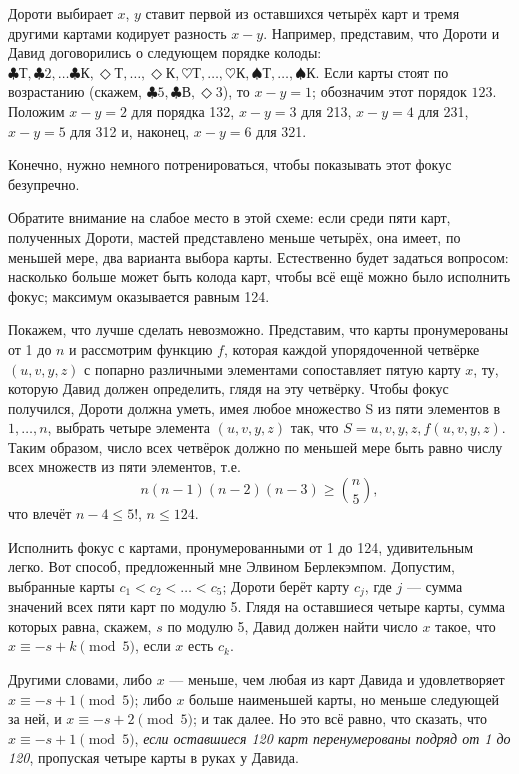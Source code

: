 Дороти выбирает $x$, $y$ ставит первой из оставшихся четырёх карт и тремя другими картами кодирует разность $x - y$.
Например, представим, что Дороти и Давид договорились о следующем порядке колоды: 
$\clubsuit \text{Т}, \clubsuit 2,\dots \clubsuit \text{К}, \Diamond \text{Т},\dots, \Diamond \text{К}, \heartsuit \text{Т}, \dots, \heartsuit \text{К}, \spadesuit  \text{Т}, \dots, \spadesuit \text{К}$.
Если карты стоят по возрастанию (скажем, $\clubsuit 5, \clubsuit \text{В}, \Diamond 3$), то $x - y = 1$; обозначим этот порядок $123$.
Положим $x - y = 2$ для порядка 132,
$x - y = 3$ для 213, $x - y = 4$ для 231, $x - y = 5$ для 312 и, наконец, $x - y = 6$ для 321.

Конечно, нужно немного потренироваться, чтобы показывать этот фокус безупречно.

\medskip

Обратите внимание на слабое место в этой схеме: если среди пяти карт, полученных Дороти, мастей представлено меньше четырёх, она имеет, по меньшей мере, два варианта выбора карты.
Естественно будет задаться вопросом: насколько больше может быть колода карт, чтобы всё ещё можно было исполнить фокус;
максимум оказывается равным 124.

Покажем, что лучше сделать невозможно.
Представим, что карты пронумерованы от 1 до $n$ и рассмотрим функцию $f$, которая каждой упорядоченной четвёрке $(u,v,y,z)$ с попарно различными элементами сопоставляет пятую карту $x$, ту, которую Давид должен определить, глядя на эту четвёрку.
Чтобы фокус получился, Дороти должна уметь, имея
любое множество S из пяти элементов в ${1, \dots, n}$, выбрать четыре элемента $(u,v,y,z)$ так, что $S = {u,v,y,z, f(u,v,y,z)}$.
Таким образом, число всех четвёрок должно по меньшей мере быть равно числу всех множеств из пяти элементов, т.е.
\[n(n - 1)(n - 2)(n - 3)\ge \binom n5,\]
что влечёт $n - 4 \le5!$, $n\le 124$.


Исполнить фокус с картами, пронумерованными от 1 до 124, удивительным легко.
Вот способ, предложенный мне Элвином Берлекэмпом.
Допустим, выбранные карты $c_1 < c_2 < \dots < c_5$;
Дороти берёт карту $c_j$, где $j$ --- сумма значений всех пяти карт по модулю 5.
Глядя на оставшиеся четыре карты, сумма которых равна, скажем, $s$ по модулю 5, Давид должен найти число $x$ такое, что $x\equiv -s + k \pmod 5$, если $x$ есть $c_k$.

Другими словами, либо $x$ --- меньше, чем любая из карт Давида и удовлетворяет 
$x\equiv-s + 1 \pmod 5$; либо $x$ больше наименьшей карты, но меньше следующей за ней, и 
$x\equiv -s + 2 \pmod 5$; и так далее.
Но это всё равно, что сказать, что $x\equiv -s + 1 \pmod 5$,
\emph{если оставшиеся 120 карт перенумерованы подряд от 1 до 120},
пропуская четыре карты в руках у Давида.

